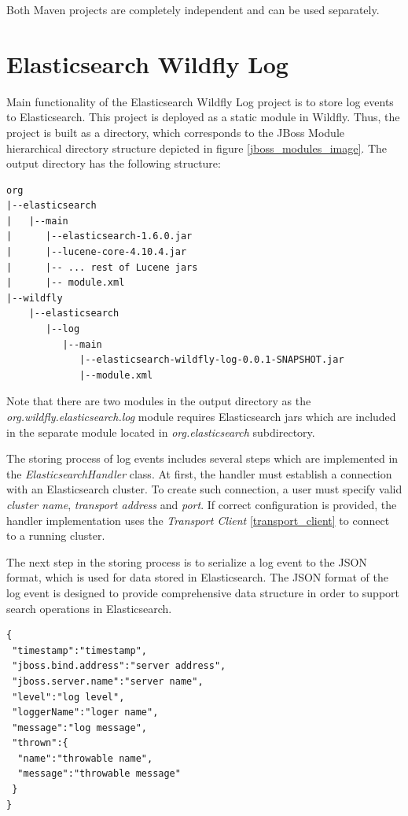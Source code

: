 \documentclass[12pt,oneside]{fithesis2}
\begin{document}
Both Maven projects are completely independent and can be used separately.

\section{Elasticsearch Wildfly Log}
Main functionality of the Elasticsearch Wildfly Log project is to store log events to Elasticsearch. This project is deployed as a static module in Wildfly. Thus, the project is built as a directory, which corresponds to the JBoss Module hierarchical directory structure depicted in figure \ref{jboss_modules_image}. The output directory has the following structure:

\begin{lstlisting}[caption = Elasticsearch Wildfly Log module directory structure, label = elasticsearch_module_structure]
org
|--elasticsearch
|   |--main
|      |--elasticsearch-1.6.0.jar
|      |--lucene-core-4.10.4.jar
|      |-- ... rest of Lucene jars
|      |-- module.xml
|--wildfly
    |--elasticsearch
       |--log
          |--main
             |--elasticsearch-wildfly-log-0.0.1-SNAPSHOT.jar
             |--module.xml
\end{lstlisting}

\noindent
Note that there are two modules in the output directory as the \textit{org.wildfly.elasticsearch.log} module requires Elasticsearch jars which are included in the separate module located in \textit{org.elasticsearch} subdirectory.

The storing process of log events includes several steps which are implemented in the \textit{ElasticsearchHandler} class. At first, the handler must establish a connection with an Elasticsearch cluster. To create such connection, a user must specify valid \textit{cluster name}, \textit{transport address} and \textit{port}.
If correct configuration is provided, the handler implementation uses the \textit{Transport Client} \ref{transport_client} to connect to a running cluster.

The next step in the storing process is to serialize a log event to the JSON format, which is used for data stored in Elasticsearch. The JSON format of the log event is designed to provide comprehensive data structure in order to support search operations in Elasticsearch.

\begin{lstlisting}[caption = JSON format of a log event, label = json_log_event]
{
 "timestamp":"timestamp",
 "jboss.bind.address":"server address",
 "jboss.server.name":"server name",
 "level":"log level",
 "loggerName":"loger name",
 "message":"log message",
 "thrown":{
  "name":"throwable name",
  "message":"throwable message"
 }
}
\end{lstlisting}
\end{document}
